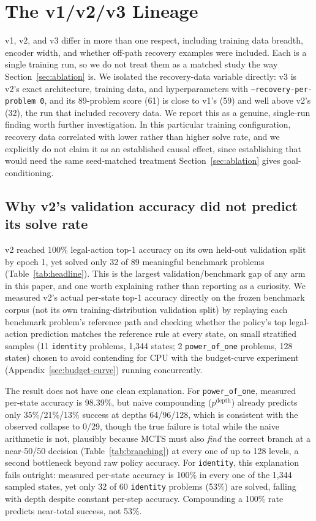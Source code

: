 \documentclass[11pt]{article}
\numberwithin{equation}{section}
\newcommand{\good}{89}
\begin{document}
\appendix
\section{The v1/v2/v3 Lineage}
\label{sec:v-lineage}

v1, v2, and v3 differ in more than one respect, including training data breadth, encoder width, and whether off-path recovery examples were included. Each is a single training run, so we do not treat them as a matched study the way Section~\ref{sec:ablation} is. We isolated the recovery-data variable directly: v3 is v2's exact architecture, training data, and hyperparameters with \texttt{--recovery-per-problem 0}, and its \good{}-problem score (61) is close to v1's (59) and well above v2's (32), the run that included recovery data. We report this as a genuine, single-run finding worth further investigation. In this particular training configuration, recovery data correlated with lower rather than higher solve rate, and we explicitly do not claim it as an established causal effect, since establishing that would need the same seed-matched treatment Section~\ref{sec:ablation} gives goal-conditioning.

\subsection{Why v2's validation accuracy did not predict its solve rate}
\label{sec:v2-gap}

v2 reached 100\% legal-action top-1 accuracy on its own held-out validation split by epoch 1, yet solved only 32 of \good{} meaningful benchmark problems (Table~\ref{tab:headline}). This is the largest validation/benchmark gap of any arm in this paper, and one worth explaining rather than reporting as a curiosity. We measured v2's actual per-state top-1 accuracy directly on the frozen benchmark corpus (not its own training-distribution validation split) by replaying each benchmark problem's reference path and checking whether the policy's top legal-action prediction matches the reference rule at every state, on small stratified samples (11 \texttt{identity} problems, 1,344 states; 2 \texttt{power\_of\_one} problems, 128 states) chosen to avoid contending for CPU with the budget-curve experiment (Appendix~\ref{sec:budget-curve}) running concurrently.

The result does not have one clean explanation. For \texttt{power\_of\_one}, measured per-state accuracy is 98.39\%, but naive compounding ($p^{\text{depth}}$) already predicts only 35\%/21\%/13\% success at depths 64/96/128, which is consistent with the observed collapse to 0/29, though the true failure is total while the naive arithmetic is not, plausibly because MCTS must also \emph{find} the correct branch at a near-50/50 decision (Table~\ref{tab:branching}) at every one of up to 128 levels, a second bottleneck beyond raw policy accuracy. For \texttt{identity}, this explanation fails outright: measured per-state accuracy is 100\% in every one of the 1,344 sampled states, yet only 32 of 60 \texttt{identity} problems (53\%) are solved, falling with depth despite constant per-step accuracy. Compounding a 100\% rate predicts near-total success, not 53\%.
\end{document}
